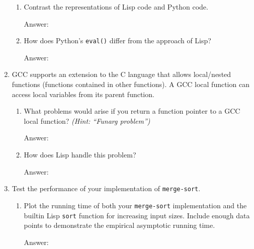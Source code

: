 \documentclass[12pt,letterpaper]{ntdhw}
\begin{document}
\begin{enumerate}
  \begin{enumerate}
    \item Contrast the representations of Lisp code and Python code.

    \begin{emph}
      Answer: %
    \end{emph}

    \item How does Python's {\tt eval()} differ from the approach of Lisp?

    \begin{emph}
      Answer: %
    \end{emph}
  \end{enumerate}

  \item GCC supports an extension to the C language that allows
  local/nested functions (functions contained in other functions).  A
  GCC local function can access local variables from its parent
  function.
  \begin{enumerate}
    \item What problems would arise if you return a function pointer
    to a GCC local function? \emph{(Hint: ``Funarg problem'')}

    \begin{emph}
      Answer: %
    \end{emph}

    \item How does Lisp handle this problem?

    \begin{emph}
      Answer: %
    \end{emph}

  \end{enumerate}

  \item Test the performance of your implementation of
    \texttt{merge-sort}.
    \begin{enumerate}

    \item Plot the running time of both your \texttt{merge-sort}
      implementation and the builtin Lisp \texttt{sort} function for
      increasing input sizes.  Include enough data points to
      demonstrate the empirical asymptotic running time.

    \begin{emph}
      Answer: %
    \end{emph}


\end{enumerate}
\end{enumerate}
\end{document}
